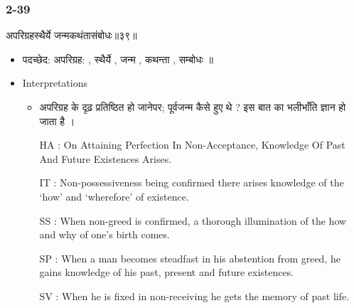 \begin{frame}[fragile]\frametitle{2-39}
\begin{sanskrit}
अपरिग्रहस्थैर्ये जन्मकथंतासंबोधः॥३९॥
\end{sanskrit}

	\begin{itemize}
	\item पदच्छेद: अपरिग्रह: , स्थैर्ये , जन्म , कथन्ता , सम्बोधः ॥
	\item Interpretations
		\begin{itemize}
		\item अपरिग्रह के दृढ़ प्रतिष्ठित हो जानेपर; पूर्वजन्म कैसे हुए थे ? इस बात का भलीभाँति ज्ञान हो जाता है ।
		\item [HA]: On Attaining Perfection In Non-Acceptance, Knowledge Of Past And Future Existences Arises.
		\item [IT]: Non-possessiveness being confirmed there arises knowledge of the ‘how’ and ‘wherefore’ of existence.
		\item [SS]: When non-greed is confirmed, a thorough illumination of the how and why of one’s birth comes.
		\item [SP]: When a man becomes steadfast in his abstention from greed, he gains knowledge of his past, present and future existences.
		\item [SV]: When he is fixed in non-receiving he gets the memory of past life. 
		\end{itemize}
	\end{itemize}	
\end{frame}



